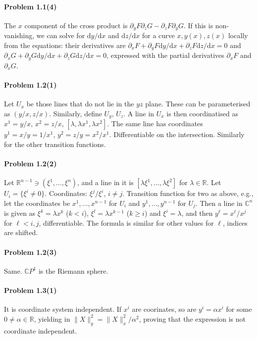 \documentclass[a4paper,12pt]{article}
\def\d{\mathrm{d}}
\newcommand{\problem}[1]{\paragraph{Problem #1}}
\begin{document}

\problem{1.1(4)} The $x$ component of the cross product is $\partial_y F \partial_z G - \partial_z F \partial_y G$. If this is non-vanishing, we can solve for $\d y/\d x$ and $\d z/\d x$ for a curve $x, y(x), z(x)$ locally from the equations: their derivatives are $\partial_x F + \partial_y F \d y/\d x + \partial_z F\d z/\d x = 0 $ and $\partial_x G + \partial_y G \d y/\d x + \partial_z G\d z/\d x = 0 $, expressed with the partial derivatives $\partial_x F$ and $\partial_x G$.


\problem{1.2(1)} Let $U_{x}$ be those lines that do not lie in the $yz$ plane. These can be parameterised as $(y/x, z/x)$. Similarly, define $U_y$, $U_z$. A line in $U_x$ is then coordinatised as $x^1 = y/x$, $x^2 = z/x$, $[\lambda,\lambda x^1, \lambda x^2]$. The same line has coordinates $y^1 = x/y= 1/x^1$, $y^2=z/y = x^2/x^1$. Differentiable on the intersection. Similarly for the other transition functions.


\problem{1.2(2)} Let $\mathbb{R}^{n-1} \ni (\xi^1, \dots, \xi^n)$, and a line in it is $[\lambda \xi^1, \dots, \lambda \xi^2]$ for $\lambda \in \mathbb{R}$. Let $U_i = \{ \xi^i \ne 0\}$. Coordinates: $\xi^j/\xi^i$, $i\ne j$. Transition function for two as above, e.g.,
let the coordinates be $x^1, \dots, x^{n-1}$ for $U_i$ and $y^1, \dots, y^{n-1}$ for $U_j$. Then a line in $\mathbb{C}^n$ is given as $\xi^k = \lambda x^k$ ($k <i$), $\xi^l = \lambda x^{k-1}$ ($k \ge i$) and $\xi^i = \lambda$, and then
$y^\ell = x^\ell / x^j$ for $\ell < i,j$, differentiable. The formula is similar for other values for $\ell$, indices are shifted.


\problem{1.2(3)} Same. $\mathbb{C}P^1$ is the Riemann sphere.


\problem{1.3(1)} It is coordinate system independent. If $x^i$ are coorinates, so are $y^i = \alpha x^i$ for some $0\ne \alpha \in \mathbb{R}$, yielding in $\|X\|^2_y = \|X\|^2_x / \alpha^2$, proving that the expression is not coordinate independent.

\end{document}

